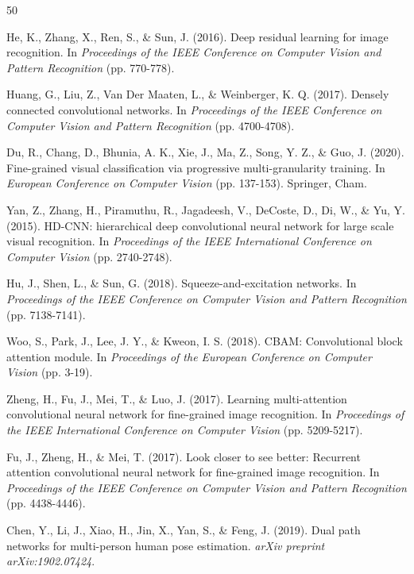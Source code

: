 \documentclass[pdflatex,sn-mathphys-num]{sn-jnl}
\theoremstyle{thmstyleone}%
\theoremstyle{thmstyletwo}%
\theoremstyle{thmstylethree}%
\begin{document}
\begin{thebibliography}{50}

 He, K., Zhang, X., Ren, S., \& Sun, J. (2016). Deep residual learning for image recognition. In \textit{Proceedings of the IEEE Conference on Computer Vision and Pattern Recognition} (pp. 770-778).

 Huang, G., Liu, Z., Van Der Maaten, L., \& Weinberger, K. Q. (2017). Densely connected convolutional networks. In \textit{Proceedings of the IEEE Conference on Computer Vision and Pattern Recognition} (pp. 4700-4708).

 Du, R., Chang, D., Bhunia, A. K., Xie, J., Ma, Z., Song, Y. Z., \& Guo, J. (2020). Fine-grained visual classification via progressive multi-granularity training. In \textit{European Conference on Computer Vision} (pp. 137-153). Springer, Cham.

 Yan, Z., Zhang, H., Piramuthu, R., Jagadeesh, V., DeCoste, D., Di, W., \& Yu, Y. (2015). HD-CNN: hierarchical deep convolutional neural network for large scale visual recognition. In \textit{Proceedings of the IEEE International Conference on Computer Vision} (pp. 2740-2748).

 Hu, J., Shen, L., \& Sun, G. (2018). Squeeze-and-excitation networks. In \textit{Proceedings of the IEEE Conference on Computer Vision and Pattern Recognition} (pp. 7138-7141).

 Woo, S., Park, J., Lee, J. Y., \& Kweon, I. S. (2018). CBAM: Convolutional block attention module. In \textit{Proceedings of the European Conference on Computer Vision} (pp. 3-19).

 Zheng, H., Fu, J., Mei, T., \& Luo, J. (2017). Learning multi-attention convolutional neural network for fine-grained image recognition. In \textit{Proceedings of the IEEE International Conference on Computer Vision} (pp. 5209-5217).

 Fu, J., Zheng, H., \& Mei, T. (2017). Look closer to see better: Recurrent attention convolutional neural network for fine-grained image recognition. In \textit{Proceedings of the IEEE Conference on Computer Vision and Pattern Recognition} (pp. 4438-4446).

 Chen, Y., Li, J., Xiao, H., Jin, X., Yan, S., \& Feng, J. (2019). Dual path networks for multi-person human pose estimation. \textit{arXiv preprint arXiv:1902.07424}.


\end{thebibliography}
\end{document}
